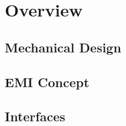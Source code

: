 \section{Overview}
\lipsum

\subsection{Mechanical Design}

\FloatBarrier
\subsection{EMI Concept}

\FloatBarrier
\subsection{Interfaces}

